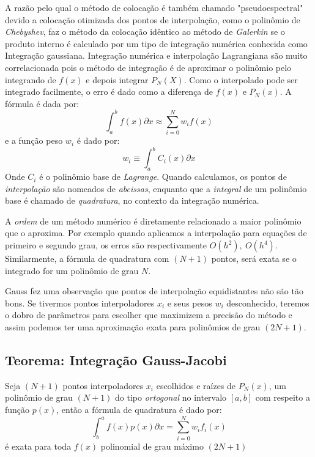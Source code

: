  A razão pelo qual o método de colocação é também chamado "pseudoespectral" devido a colocação otimizada dos pontos de interpolação, como o polinômio de \emph{Chebyshev}, faz o método da colocação idêntico ao método de \emph{Galerkin} se o produto interno é calculado por um tipo de integração numérica conhecida como Integração gaussiana. 
 Integração numérica e interpolação Lagrangiana são muito correlacionada pois o método de integração é de aproximar o polinômio pelo integrando de $f(x)$ e depois integrar $P_N(X)$. Como o interpolado pode ser integrado facilmente, o erro é dado como a diferença de $f(x)$ e $P_N(x)$.  A fórmula é dada por:
 \begin{equation}
  \int_a^b f(x) \partial x \approx \sum_{i = 0}^N w_i f(x)
 \end{equation}
 e a função peso $w_i$ é dado por:
 \begin{equation}
  w_i \equiv \int_{a}^{b} C_i(x) \partial x
 \end{equation}
 Onde $C_i$ é o polinômio base de \emph{Lagrange}.
 Quando calculamos, os pontos de \emph{interpolação} são nomeados de \emph{abcissas}, enquanto que a \emph{integral} de um polinômio base é chamado de \emph{quadratura}, no contexto da integração numérica.
 
 A \emph{ordem} de um método numérico é diretamente relacionado a maior polinômio que o aproxima. Por exemplo quando aplicamos a interpolação para equações de primeiro e segundo grau, os erros são respectivamente $O(h^2),\ O(h^4)$. Similarmente, a fórmula de quadratura com $(N + 1)$ pontos, será exata se o integrado for um polinômio de grau $N$.
 
 Gauss fez uma observação que pontos de interpolação equidistantes não são tão bons. Se tivermos pontos interpoladores $x_i$ e seus pesos $w_i$ 
desconhecido, teremos o dobro de parâmetros para escolher que maximizem a precisão do método e assim podemos ter uma aproximação exata para polinômios de grau $(2N + 1)$.
\subsection{Teorema: Integração Gauss-Jacobi}
 Seja $(N + 1)$ pontos interpoladores $x_i$ escolhidos e raízes de $P_N(x)$, um polinômio de grau $(N+1)$ do tipo \emph{ortogonal} no intervalo $[a,b]$ com respeito a função $p(x)$, então a fórmula de quadratura é dado por:
\begin{equation}
 \int^a_b f(x)p(x) \partial x = \sum^{N}_{i= 0} w_i f_i(x)
\end{equation} 
é exata para toda $f(x)$ polinomial de grau máximo $(2N +1)$

